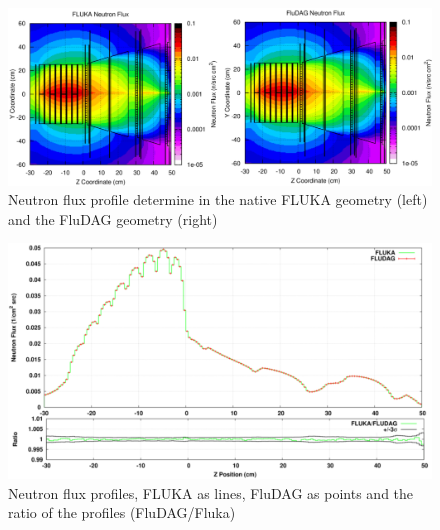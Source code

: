 \begin{figure}[ht!]
 \begin{centering}
 \centering
 \includegraphics[width=0.7\paperwidth]{../figs/atic_neutron_flux.png}
 \caption{Neutron flux profile determine in the native FLUKA geometry (left) and the FluDAG geometry (right)}
 \label{fig:atic_neutron_flux}
 \end{centering}
\end{figure}
\begin{figure}[ht!]
 \begin{centering}
 \centering
 \includegraphics[width=0.7\paperwidth]{../figs/atic_neutron_flux_lineout.png}
 \caption{Neutron flux profiles, FLUKA as lines, FluDAG as points and the ratio of the profiles (FluDAG/Fluka)}
 \label{fig:atic_neutron_flux_lineout}
 \end{centering}
\end{figure}

